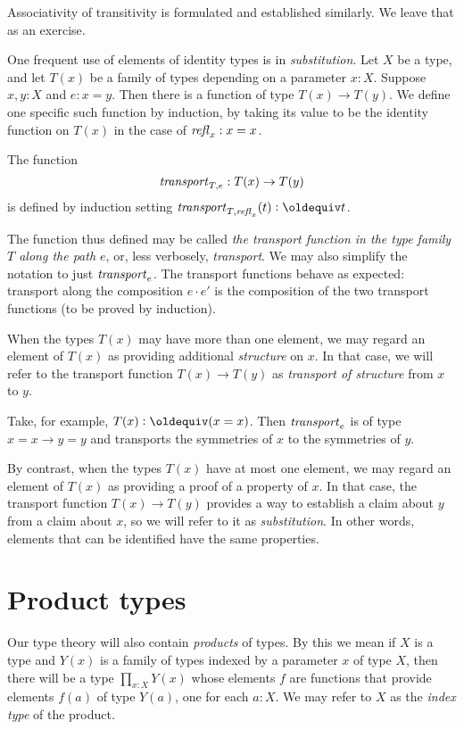 Associativity of transitivity is formulated and established similarly.  
We leave that as an exercise.

One frequent use of elements of identity types is in \emph{substitution}.  Let $X$ be a type, and let $T(x)$ be a family of types depending on a
parameter $x:X$.  Suppose $x,y:X$ and $e:x=y$.  Then there is a function of type $T(x) \to T(y)$. We define one specific such function by induction, by taking its value to be the identity function on $T(x)$ in the case of $\mathop{{\it refl}_{x}}:x=x$.
\begin{definition}\label{def:transport} The function
  \[ 
  \mathord{\mathit{transport}}_{T,e} : T(x) \to T(y)
  \]
  is defined by induction setting $\trp_{T,\refl{x}} (t) \defeq t$.
\end{definition} 
The function thus defined may be called 
\emph{the transport function in the type family $T$ along the path $e$}, 
 or, less verbosely, \emph{transport}.
 We may also simplify the notation to just $\mathord{\mathit{transport}}_e$.
The transport functions behave as expected: transport along the composition
$e\cdot e'$ is the composition of the two transport functions (to be
 proved by induction).

When the types $T(x)$ may have more than one element, 
we may regard an element of $T(x)$ as providing additional {\em structure} on $x$. 
In that case, we will refer to the transport function $T(x) \to T(y)$ as 
\emph{transport of structure} from $x$ to $y$. 

Take, for example, $T(x)\defeq (x=x)$. 
Then $\mathord{\mathit{transport}}_e$ is of type $x=x \to y=y$ and transports the
symmetries of $x$ to the symmetries of $y$.

By contrast, when the types
$T(x)$ have at most one element, we may regard an element of $T(x)$ 
as providing a proof of a property of $x$. In that case, the transport
function $T(x) \to T(y)$ provides a way to establish a claim about $y$ 
from a claim about $x$, so we will refer to it as \emph{substitution}.  In
other words, elements that can be identified have the same properties.



\section{Product types}
\label{sec:product-types}
Our type theory will also contain \emph{products} of types. 
By this we mean if $X$ is a type and $Y(x)$ is a family of types indexed by a
parameter $x$ of type $X$, then there will be a type $\prod_{x:X} Y(x)$ 
whose elements $f$ are functions that provide elements $f(a)$ of type
$Y(a)$, one for each $a:X$. We may refer to $X$ as the 
\emph{index type} of the product.

